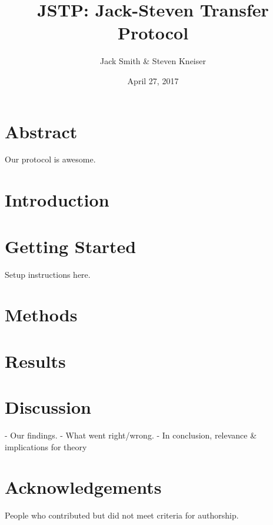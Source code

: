 \documentclass{article}
\title{JSTP: Jack-Steven Transfer Protocol}
\author{Jack Smith \& Steven Kneiser}
\date{April 27, 2017}
\begin{document}
\maketitle

\section{Abstract}
Our protocol is awesome.

\section{Introduction}

\section{Getting Started}
Setup instructions here.

\section{Methods}

\section{Results}

\section{Discussion}
- Our findings.
- What went right/wrong.
- In conclusion, relevance \& implications for theory

\section{Acknowledgements}
People who contributed but did not meet criteria for authorship.
\end{document}
